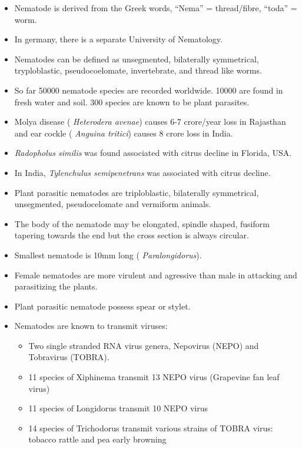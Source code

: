 \documentclass[
]{book}
\providecommand{\tightlist}{%
  \setlength{\itemsep}{0pt}\setlength{\parskip}{0pt}}
\begin{document}
\begin{itemize}
\item
  Nematode is derived from the Greek words, ``Nema'' = thread/fibre, ``toda'' = worm.
\item
  In germany, there is a separate University of Nematology.
\item
  Nematodes can be defined as unsegmented, bilaterally symmetrical, tryploblastic, pseudocoelomate, invertebrate, and thread like worms.
\item
  So far 50000 nematode species are recorded worldwide. 10000 are found in fresh water and soil. 300 species are known to be plant parasites.
\item
  Molya disease ( \emph{Heterodera avenae}) causes 6-7 crore/year loss in Rajasthan and ear cockle ( \emph{Anguina tritici}) causes 8 crore loss in India.
\item
  \emph{Radopholus similis} was found associated with citrus decline in Florida, USA.
\item
  In India, \emph{Tylenchulus semipenetrans} was associated with citrus decline.
\item
  Plant parasitic nematodes are triploblastic, bilaterally symmetrical, unsegmented, pseudocelomate and vermiform animals.
\item
  The body of the nematode may be elongated, spindle shaped, fusiform tapering towards the end but the cross section is always circular.
\item
  Smallest nematode is 10mm long ( \emph{Paralongidorus}).
\item
  Female nematodes are more virulent and agressive than male in attacking and parasitizing the plants.
\item
  Plant parasitic nematode possess spear or stylet.
\item
  Nematodes are known to transmit viruses:

  \begin{itemize}
  \tightlist
  \item
    Two single stranded RNA virus genera, Nepovirus (NEPO) and Tobravirus (TOBRA).
  \item
    11 species of Xiphinema transmit 13 NEPO virus (Grapevine fan leaf virus)
  \item
    11 species of Longidorus transmit 10 NEPO virus
  \item
    14 species of Trichodorus transmit various strains of TOBRA virus: tobacco rattle and pea early browning
  \end{itemize}
\end{itemize}
\end{document}
